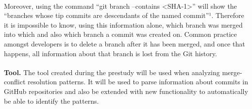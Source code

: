 \paragraph*{}
Moreover, using the command “git branch --contains <SHA-1>” will show the “branches whose tip commits are descendants of the named commit”¹. Therefore it is impossible to know, using this information alone, which branch was merged into which and also which branch a commit was created on. Common practice amongst developers is to delete a branch after it has been merged, and once that happens, all information about that branch is lost from the Git history.
\paragraph*{}
\textbf{Tool.} The tool created during the prestudy will be used when analyzing merge-conflict resolution patterns. It will be used to parse information about commits in GitHub repositories and also be extended with new functionality to automatically be able to identify the patterns.
